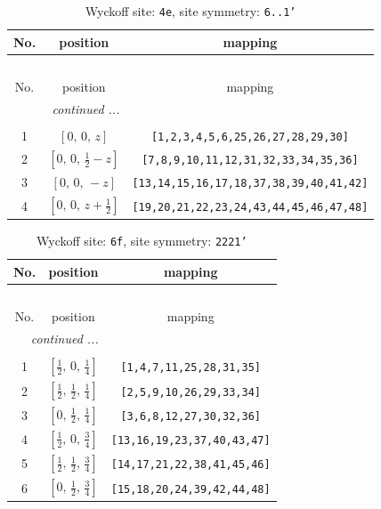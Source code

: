 \documentclass[fleqn,8pt]{jsarticle}
\begin{document}
\renewcommand{\arraystretch}{1.2}
\begin{longtable}{ccc}
\caption{Wyckoff site: {\tt 4e}, site symmetry: {\tt 6..1'}}
 \\
 \hline \hline
No. & position & mapping \\ \hline \endfirsthead

\multicolumn{2}{l}{\tablename\ \thetable{}} \\
 \hline \hline
No. & position & mapping \\ \hline \endhead

 \hline \hline
\multicolumn{2}{r}{\footnotesize\it continued ...} \\ \endfoot

 \hline \hline
\multicolumn{2}{r}{} \\ \endlastfoot

1 & $\left[ 0,\, 0,\, z \right]$ & {\tt [1,2,3,4,5,6,25,26,27,28,29,30]} \\ \hline
2 & $\left[ 0,\, 0,\, \frac{1}{2} - z \right]$ & {\tt [7,8,9,10,11,12,31,32,33,34,35,36]} \\ \hline
3 & $\left[ 0,\, 0,\, - z \right]$ & {\tt [13,14,15,16,17,18,37,38,39,40,41,42]} \\ \hline
4 & $\left[ 0,\, 0,\, z + \frac{1}{2} \right]$ & {\tt [19,20,21,22,23,24,43,44,45,46,47,48]} \\
\end{longtable}
\renewcommand{\arraystretch}{1.2}
\begin{longtable}{ccc}
\caption{Wyckoff site: {\tt 6f}, site symmetry: {\tt 2221'}}
 \\
 \hline \hline
No. & position & mapping \\ \hline \endfirsthead

\multicolumn{2}{l}{\tablename\ \thetable{}} \\
 \hline \hline
No. & position & mapping \\ \hline \endhead

 \hline \hline
\multicolumn{2}{r}{\footnotesize\it continued ...} \\ \endfoot

 \hline \hline
\multicolumn{2}{r}{} \\ \endlastfoot

1 & $\left[ \frac{1}{2},\, 0,\, \frac{1}{4} \right]$ & {\tt [1,4,7,11,25,28,31,35]} \\ \hline
2 & $\left[ \frac{1}{2},\, \frac{1}{2},\, \frac{1}{4} \right]$ & {\tt [2,5,9,10,26,29,33,34]} \\ \hline
3 & $\left[ 0,\, \frac{1}{2},\, \frac{1}{4} \right]$ & {\tt [3,6,8,12,27,30,32,36]} \\ \hline
4 & $\left[ \frac{1}{2},\, 0,\, \frac{3}{4} \right]$ & {\tt [13,16,19,23,37,40,43,47]} \\ \hline
5 & $\left[ \frac{1}{2},\, \frac{1}{2},\, \frac{3}{4} \right]$ & {\tt [14,17,21,22,38,41,45,46]} \\ \hline
6 & $\left[ 0,\, \frac{1}{2},\, \frac{3}{4} \right]$ & {\tt [15,18,20,24,39,42,44,48]} \\
\end{longtable}
\end{document}
